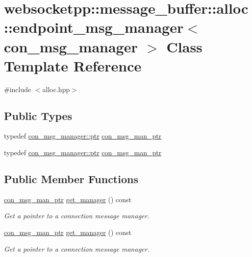 \hypertarget{classwebsocketpp_1_1message__buffer_1_1alloc_1_1endpoint__msg__manager}{}\section{websocketpp\+:\+:message\+\_\+buffer\+:\+:alloc\+:\+:endpoint\+\_\+msg\+\_\+manager$<$ con\+\_\+msg\+\_\+manager $>$ Class Template Reference}
\label{classwebsocketpp_1_1message__buffer_1_1alloc_1_1endpoint__msg__manager}


{\ttfamily \#include $<$alloc.\+hpp$>$}

\subsection*{Public Types}
\begin{DoxyCompactItemize}
\item 
typedef \hyperlink{classwebsocketpp_1_1message__buffer_1_1alloc_1_1con__msg__manager_ab4a21eb77cea439747f0b988e643e940}{con\+\_\+msg\+\_\+manager\+::ptr} \hyperlink{classwebsocketpp_1_1message__buffer_1_1alloc_1_1endpoint__msg__manager_aa850684cf613468b4c6bb1497dcb2f52}{con\+\_\+msg\+\_\+man\+\_\+ptr}
\item 
typedef \hyperlink{classwebsocketpp_1_1message__buffer_1_1alloc_1_1con__msg__manager_ab4a21eb77cea439747f0b988e643e940}{con\+\_\+msg\+\_\+manager\+::ptr} \hyperlink{classwebsocketpp_1_1message__buffer_1_1alloc_1_1endpoint__msg__manager_aa850684cf613468b4c6bb1497dcb2f52}{con\+\_\+msg\+\_\+man\+\_\+ptr}
\end{DoxyCompactItemize}
\subsection*{Public Member Functions}
\begin{DoxyCompactItemize}
\item 
\hyperlink{classwebsocketpp_1_1message__buffer_1_1alloc_1_1endpoint__msg__manager_aa850684cf613468b4c6bb1497dcb2f52}{con\+\_\+msg\+\_\+man\+\_\+ptr} \hyperlink{classwebsocketpp_1_1message__buffer_1_1alloc_1_1endpoint__msg__manager_a6652d0a87adff2a70770f7ef1d1d02c2}{get\+\_\+manager} () const 
\begin{DoxyCompactList}\small\item\em Get a pointer to a connection message manager. \end{DoxyCompactList}\item 
\hyperlink{classwebsocketpp_1_1message__buffer_1_1alloc_1_1endpoint__msg__manager_aa850684cf613468b4c6bb1497dcb2f52}{con\+\_\+msg\+\_\+man\+\_\+ptr} \hyperlink{classwebsocketpp_1_1message__buffer_1_1alloc_1_1endpoint__msg__manager_a6652d0a87adff2a70770f7ef1d1d02c2}{get\+\_\+manager} () const 
\begin{DoxyCompactList}\small\item\em Get a pointer to a connection message manager. \end{DoxyCompactList}\end{DoxyCompactItemize}


